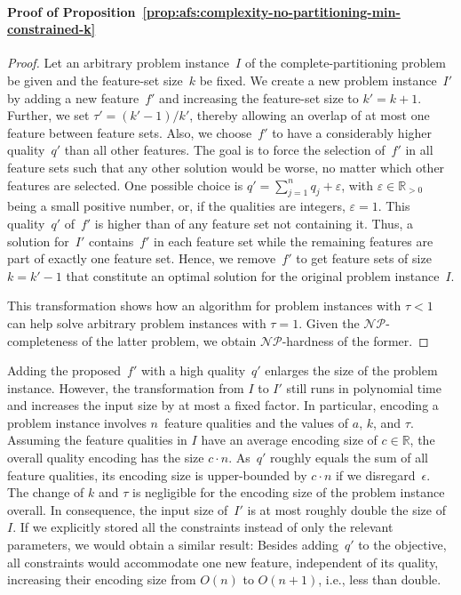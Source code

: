 \documentclass[iicol, sn-basic, Numbered]{sn-jnl} %
\theoremstyle{plain}
\theoremstyle{definition}
\begin{document}
\begin{appendices}
\paragraph{Proof of Proposition~\ref{prop:afs:complexity-no-partitioning-min-constrained-k}}
%
\begin{proof}
	Let an arbitrary problem instance~$I$ of the complete-partitioning problem be given and the feature-set size~$k$ be fixed.
	We create a new problem instance~$I'$ by adding a new feature~$f'$ and increasing the feature-set size to $k' = k + 1$.
	Further, we set $\tau' = (k' - 1) / k'$, thereby allowing an overlap of at most one feature between feature sets.
	Also, we choose~$f'$ to have a considerably higher quality~$q'$ than all other features.
	The goal is to force the selection of~$f'$ in all feature sets such that any other solution would be worse, no matter which other features are selected.
	One possible choice is $q' = \sum_{j=1}^n q_j + \varepsilon$, with $\varepsilon \in \mathbb{R}_{> 0}$ being a small positive number, or, if the qualities are integers, $\varepsilon = 1$.
	This quality~$q'$ of~$f'$ is higher than of any feature set not containing it.
	Thus, a solution for~$I'$ contains~$f'$ in each feature set while the remaining features are part of exactly one feature set.
	Hence, we remove~$f'$ to get feature sets of size~$k = k' - 1$ that constitute an optimal solution for the original problem instance~$I$.

	This transformation shows how an algorithm for problem instances with $\tau < 1$ can help solve arbitrary problem instances with $\tau = 1$.
	Given the $\mathcal{NP}$-completeness of the latter problem, we obtain $\mathcal{NP}$-hardness of the former.
\end{proof}
%
Adding the proposed~$f'$ with a high quality~$q'$ enlarges the size of the problem instance.
However, the transformation from $I$ to $I'$ still runs in polynomial time and increases the input size by at most a fixed factor.
In particular, encoding a problem instance involves $n$~feature qualities and the values of $a$, $k$, and $\tau$.
Assuming the feature qualities in $I$ have an average encoding size of $c \in \mathbb{R}$, the overall quality encoding has the size $c \cdot n$.
As~$q'$ roughly equals the sum of all feature qualities, its encoding size is upper-bounded by $c \cdot n$ if we disregard~$\epsilon$.
The change of $k$ and $\tau$ is negligible for the encoding size of the problem instance overall.
In consequence, the input size of~$I'$ is at most roughly double the size of~$I$.
If we explicitly stored all the constraints instead of only the relevant parameters, we would obtain a similar result:
Besides adding~$q'$ to the objective, all constraints would accommodate one new feature, independent of its quality, increasing their encoding size from $O(n)$ to $O(n+1)$, i.e., less than double.


\end{appendices}
\end{document}
